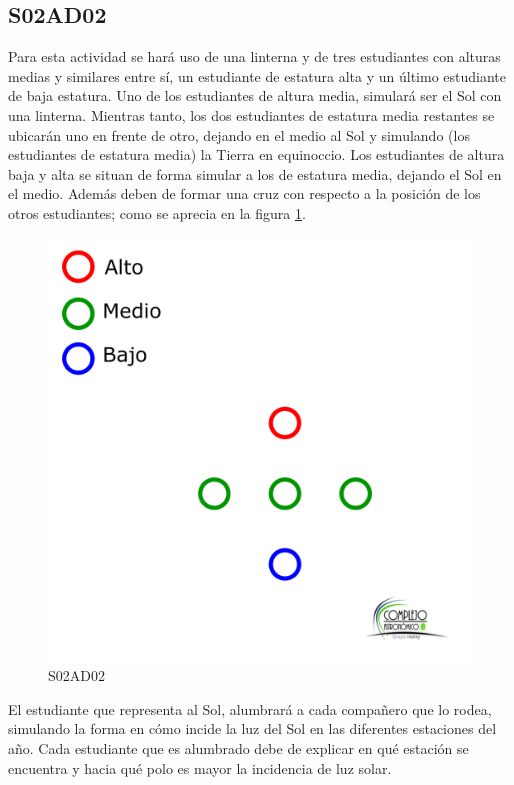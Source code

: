 \documentclass[10pt,a4paper]{article}
\begin{document}
\subsection{S02AD02}
Para esta actividad se hará uso de una linterna y de tres estudiantes con alturas medias y similares entre sí, un estudiante de estatura alta y un último estudiante de baja estatura. Uno de los estudiantes de altura media, simulará ser el Sol con una linterna. Mientras tanto, los dos estudiantes de estatura media restantes se ubicarán uno en frente de otro, dejando en el medio al Sol y simulando (los estudiantes de estatura media) la Tierra en equinoccio. Los estudiantes de altura baja y alta se situan de forma simular a los de estatura media, dejando el Sol en el medio. Además deben de formar una cruz con respecto a la posición de los otros estudiantes; como se aprecia en la figura \ref{S02AD02}. \\

\begin{figure}[H]
\centering
\includegraphics[scale=0.07]{Imagenes/S02AD02.png} 
\caption{S02AD02}
\label{S02AD02}
\end{figure} 

El estudiante que representa al Sol, alumbrará a cada compañero que lo rodea, simulando la forma en cómo incide la luz 
del Sol en las diferentes estaciones del año. Cada estudiante que es alumbrado debe de explicar en qué estación 
se encuentra y hacia qué polo es mayor la incidencia de luz solar.
\end{document}
